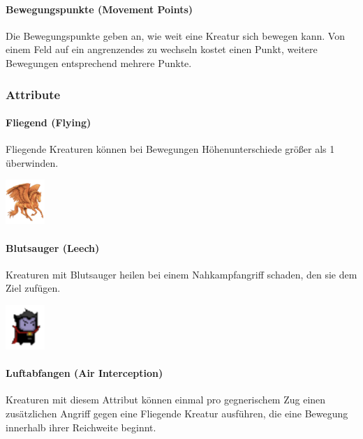 \documentclass[a4paper,12pt]{scrartcl}
\begin{document}
	\paragraph{Bewegungspunkte (\glqq Movement Points\grqq\hspace{0.05em})}
	Die Bewegungspunkte geben an, wie weit eine Kreatur sich bewegen kann. Von einem Feld auf ein angrenzendes zu wechseln kostet einen Punkt, weitere Bewegungen entsprechend mehrere Punkte.
	
	\subsubsection{Attribute}
	
	\paragraph{Fliegend (\glqq Flying\grqq\hspace{0.05em})}
	Fliegende Kreaturen können bei Bewegungen Höhenunterschiede größer als 1 überwinden.\\
	\begin{center}
		\includegraphics{Prog2_EA_V2/Art/Pegasus.png}\end{center}
	
	\paragraph{Blutsauger (\glqq Leech\grqq\hspace{0.05em})}
	Kreaturen mit Blutsauger heilen bei einem Nahkampfangriff schaden, den sie dem Ziel zufügen.\\
	\begin{center}\includegraphics{Prog2_EA_V2/Art/Vampire.png}\end{center}
	
	\paragraph{Luftabfangen (\glqq Air Interception\grqq\hspace{0.05em})}
	Kreaturen mit diesem Attribut können einmal pro gegnerischem Zug einen zusätzlichen Angriff gegen eine Fliegende Kreatur ausführen, die eine Bewegung innerhalb ihrer Reichweite beginnt.
	
\end{document}
